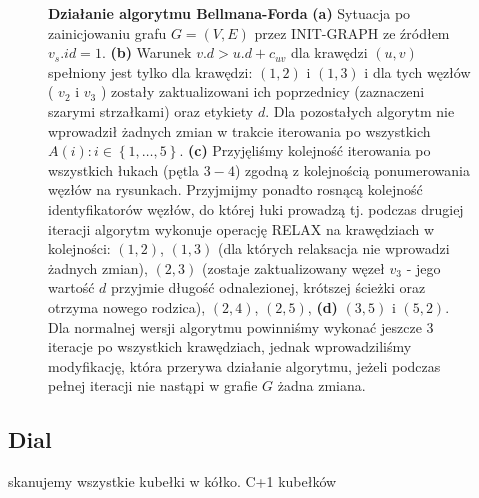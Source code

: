 \begin{figure}[!htbp]
\begin{subfigure}[b]{0.33\textwidth}
		\caption{}
	\end{subfigure}
	\caption{\textbf{Działanie algorytmu Bellmana-Forda} \textbf{(a)} Sytuacja po zainicjowaniu grafu $G = \left( V, E \right)$ przez \textsf{INIT-GRAPH} ze źródłem $v_{s}.id = 1$. \textbf{(b)} Warunek $ v.d > u.d + c_{uv} $ dla krawędzi $ \left( u, v \right) $ spełniony jest tylko dla krawędzi: $ \left( 1, 2 \right) $ i $ \left( 1, 3 \right) $ i dla tych węzłów ( $v_{2}$ i $v_{3}$ ) zostały zaktualizowani ich poprzednicy (zaznaczeni szarymi strzałkami) oraz etykiety $d$. Dla pozostałych algorytm nie wprowadził żadnych zmian w trakcie iterowania po wszystkich $ A \left( i \right) : i \in \left\{ 1, \ldots, 5\right\}$. \textbf{(c)} Przyjęliśmy kolejność iterowania po wszystkich łukach (pętla $3-4$) zgodną z kolejnością ponumerowania węzłów na rysunkach. Przyjmijmy ponadto rosnącą kolejność identyfikatorów węzłów, do której łuki prowadzą tj. podczas drugiej iteracji algorytm wykonuje operację \textsf{RELAX} na krawędziach w kolejności: $ \left( 1, 2 \right) $, $ \left( 1, 3 \right) $ (dla których relaksacja nie wprowadzi żadnych zmian), $ \left( 2, 3 \right) $ (zostaje zaktualizowany węzeł $v_{3}$ - jego wartość $d$ przyjmie długość odnalezionej, krótszej ścieżki oraz otrzyma nowego rodzica), $ \left( 2, 4 \right) $, $ \left( 2, 5 \right) $, \textbf{(d)} $ \left( 3, 5 \right) $ i $ \left( 5, 2 \right) $. Dla normalnej wersji algorytmu powinniśmy wykonać jeszcze 3 iteracje po wszystkich krawędziach, jednak wprowadziliśmy modyfikację, która przerywa działanie algorytmu, jeżeli podczas pełnej iteracji nie nastąpi w grafie $G$ żadna zmiana.} \label{fig:exampleBellmanFord}
\end{figure}

\subsection{Dial}


skanujemy wszystkie kubełki w kółko. C+1 kubełków


